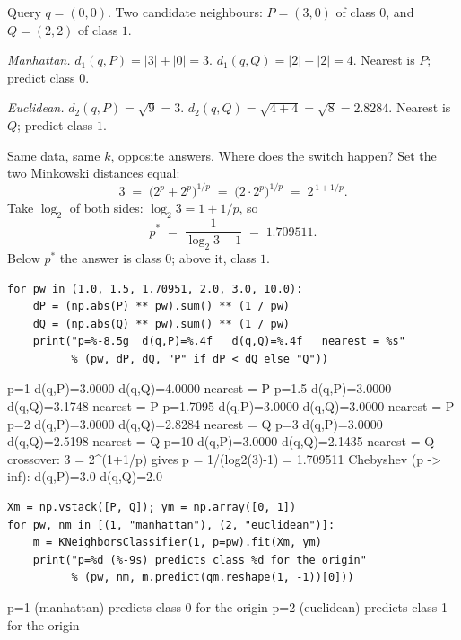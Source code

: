 \documentclass[11pt]{article}
\begin{document}
\begin{worked}
Query $q = (0,0)$. Two candidate neighbours:
$P = (3, 0)$ of class $0$, and $Q = (2, 2)$ of class $1$.

\emph{Manhattan.} $d_1(q,P) = |3| + |0| = 3$. $d_1(q,Q) = |2| + |2| = 4$.
Nearest is $P$; predict class $0$.

\emph{Euclidean.} $d_2(q,P) = \sqrt{9} = 3$. $d_2(q,Q) = \sqrt{4+4} =
\sqrt{8} = 2.8284$. Nearest is $Q$; predict class $1$.

Same data, same $k$, opposite answers. Where does the switch happen? Set the
two Minkowski distances equal:
\[
  3 \;=\; \bigl(2^p + 2^p\bigr)^{1/p} \;=\; \bigl(2 \cdot 2^p\bigr)^{1/p}
    \;=\; 2^{\,1 + 1/p}.
\]
Take $\log_2$ of both sides: $\log_2 3 = 1 + 1/p$, so
\[
  p^\ast \;=\; \frac{1}{\log_2 3 - 1} \;=\; 1.709511.
\]
Below $p^\ast$ the answer is class $0$; above it, class $1$.
\end{worked}

\begin{lstlisting}
for pw in (1.0, 1.5, 1.70951, 2.0, 3.0, 10.0):
    dP = (np.abs(P) ** pw).sum() ** (1 / pw)
    dQ = (np.abs(Q) ** pw).sum() ** (1 / pw)
    print("p=%-8.5g  d(q,P)=%.4f   d(q,Q)=%.4f   nearest = %s"
          % (pw, dP, dQ, "P" if dP < dQ else "Q"))
\end{lstlisting}
\begin{codeout}
p=1         d(q,P)=3.0000   d(q,Q)=4.0000   nearest = P
p=1.5       d(q,P)=3.0000   d(q,Q)=3.1748   nearest = P
p=1.7095    d(q,P)=3.0000   d(q,Q)=3.0000   nearest = P
p=2         d(q,P)=3.0000   d(q,Q)=2.8284   nearest = Q
p=3         d(q,P)=3.0000   d(q,Q)=2.5198   nearest = Q
p=10        d(q,P)=3.0000   d(q,Q)=2.1435   nearest = Q
crossover: 3 = 2^(1+1/p)  gives  p = 1/(log2(3)-1) = 1.709511
Chebyshev (p -> inf): d(q,P)=3.0   d(q,Q)=2.0
\end{codeout}

\begin{lstlisting}
Xm = np.vstack([P, Q]); ym = np.array([0, 1])
for pw, nm in [(1, "manhattan"), (2, "euclidean")]:
    m = KNeighborsClassifier(1, p=pw).fit(Xm, ym)
    print("p=%d (%-9s) predicts class %d for the origin"
          % (pw, nm, m.predict(qm.reshape(1, -1))[0]))
\end{lstlisting}
\begin{codeout}
p=1 (manhattan) predicts class 0 for the origin
p=2 (euclidean) predicts class 1 for the origin
\end{codeout}
\end{document}
